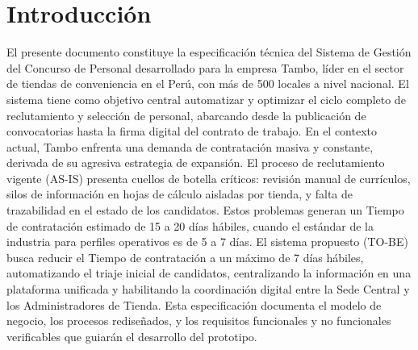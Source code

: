 \chapter{Introducción}
El presente documento constituye la especificación técnica del Sistema de Gestión del Concurso de Personal 
 desarrollado para la empresa Tambo, líder en el sector de tiendas de conveniencia en el Perú, con más de 500 locales a nivel 
 nacional. El sistema tiene como objetivo central automatizar y optimizar el ciclo completo de reclutamiento y selección de 
 personal, abarcando desde la publicación de convocatorias hasta la firma digital del contrato de trabajo.
En el contexto actual, Tambo enfrenta una demanda de contratación masiva y constante, derivada de su agresiva 
estrategia de expansión. El proceso de reclutamiento vigente (AS-IS) presenta cuellos de botella críticos: 
revisión manual de currículos, silos de información en hojas de cálculo aisladas por tienda, y falta de trazabilidad 
en el estado de los candidatos. Estos problemas generan un Tiempo de contratación estimado de 15 a 20 días hábiles, 
cuando el estándar de la industria para perfiles operativos es de 5 a 7 días.
El sistema propuesto (TO-BE) busca reducir el Tiempo de contratación a un máximo de 7 días hábiles, 
automatizando el triaje inicial de candidatos, centralizando la información en una plataforma unificada y habilitando
 la coordinación digital entre la Sede Central y los Administradores de Tienda. Esta especificación documenta el 
 modelo de negocio, los procesos rediseñados, y los requisitos funcionales y no funcionales verificables que guiarán
  el desarrollo del prototipo.
